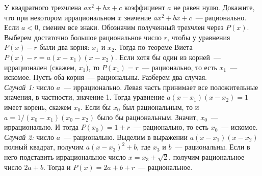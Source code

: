 \problem
У квадратного трехчлена $a x^2 + b x + c$ коэффициент $a$ не равен нулю.
Докажите, что при некотором иррациональном $x$ значение
$a x^2 + b x + c$~--- рационально.
\solution
Если $a < 0$, сменим все знаки.
Обозначим полученный трехчлен через $P(x)$.
Выберем достаточно большое рациональное число $r$, чтобы у уравнения
$P(x) - r$ были два корня: $x_1$ и $x_2$.
Тогда по теореме Виета $P(x) - r = a (x - x_1) (x - x_2)$.
Если хотя бы один из корней~--- иррационален (скажем, $x_1$), то
$P(x_1) = r$~--- рационально, то есть $x_1$~--- искомое.
Пусть оба корня~--- рациональны.
Разберем два случая.
\\
\emph{Случай 1:} число $a$~--- иррационально.
Левая часть принимает все положительные значения, в частности, значение 1.
Тогда уравнение $a (x - x_1) (x - x_2) = 1$ имеет корень, скажем $x_0$.
Если бы  $x_0$ был рациональным, то и $a = 1 / (x_0 - x_1) (x_0 - x_2)$ было бы
рациональным.
Значит, $x_0$~--- иррационально.
И тогда $P(x_0) = 1 + r$~--- рационально, то есть $x_0$~--- искомое.
\\
\emph{Случай 2:} число $a$~--- рационально.
Выделим в выражении $a (x - x_1) (x - x_2)$ полный квадрат, получим
$a (x - x_3)^2 + b$, где $x_3$ и $b$~--- рациональны.
Если в него подставить иррациональное число $x = x_3 + \sqrt{2}$, получим
рациональное число $2 a + b$.
Тогда и $P(x) = 2 a + b + r$~--- рациональное. 
\endproblem

